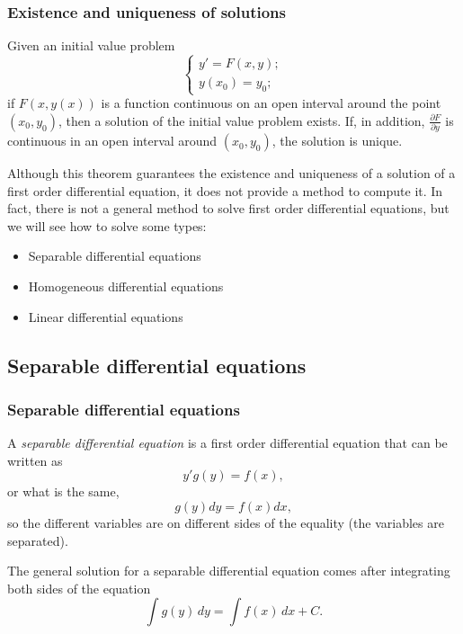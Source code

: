 \begin{frame}
\frametitle{Existence and uniqueness of solutions}
\begin{theorem}
Given an initial value problem 
\[
\begin{cases}
y'=F(x,y);\\
y(x_0)=y_0;
\end{cases}
\]
if $F(x,y(x))$ is a function continuous on an open interval around the point $(x_0,y_0)$, then a solution of the initial value problem exists. 
If, in addition, $\frac{\partial F}{\partial y}$ is continuous in an open interval around $(x_0,y_0)$, the solution is unique. 
\end{theorem}

Although this theorem guarantees the existence and uniqueness of a solution of a first order differential equation, it does not provide a method to compute it. 
In fact, there is not a general method to solve first order differential equations, but we will see how to solve some types:
\begin{itemize}
\item Separable differential equations
\item Homogeneous differential equations
\item Linear differential equations
\end{itemize}
\end{frame}



\subsection{Separable differential equations}
\begin{frame}
\frametitle{Separable differential equations}
\begin{definition}
A \emph{separable differential equation} is a first order differential equation that can be written as
\[y'g(y)=f(x),\]
or what is the same,
\[g(y)dy=f(x)dx,\]
so the different variables are on different sides of the equality (the variables are separated).
\end{definition}

The general solution for a separable differential equation comes after integrating both sides of the equation
\[\int g(y)\,dy = \int f(x)\,dx+C.\]
\end{frame}


